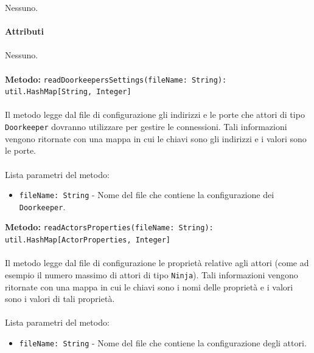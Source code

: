 \documentclass[a4paper]{article}
\begin{document}
			Nessuno.
			\\ \\
		\textbf{Attributi}
			\\ \\
			Nessuno.
			\\ \\
		\textbf{Metodo: }\texttt{readDoorkeepersSettings(fileName: String): util.HashMap[String, Integer]}
			\\ \\
			Il metodo legge dal file di configurazione gli indirizzi e le porte che attori di tipo \texttt{Doorkeeper} dovranno utilizzare per gestire le connessioni. Tali informazioni vengono ritornate con una mappa in cui le chiavi sono gli indirizzi e i valori sono le porte.
			\\ \\
			Lista parametri del metodo:
			\begin{itemize}
				\item \texttt{fileName: String} - Nome del file che contiene la configurazione dei \texttt{Doorkeeper}.
			\end{itemize}
		\textbf{Metodo: }\texttt{readActorsProperties(fileName: String): util.HashMap[ActorProperties, Integer]}
			\\ \\
			Il metodo legge dal file di configurazione le proprietà relative agli attori (come ad esempio il numero massimo di attori di tipo \texttt{Ninja}). Tali informazioni vengono ritornate con una mappa in cui le chiavi sono i nomi delle proprietà e i valori sono i valori di tali proprietà.
			\\ \\
			Lista parametri del metodo:
			\begin{itemize}
				\item \texttt{fileName: String} - Nome del file che contiene la configurazione degli attori.
			\end{itemize}
			
\end{document}
